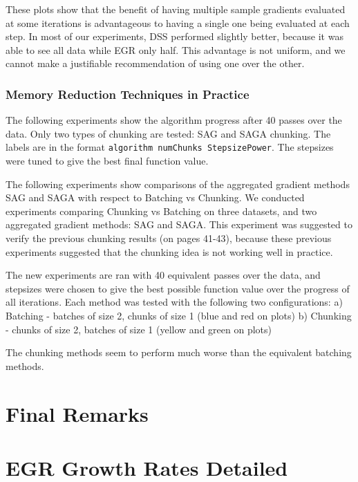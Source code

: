 \documentclass[11pt]{article}
\begin{document}
   These plots show that the benefit of having multiple sample gradients evaluated at some iterations is advantageous to having a single one being evaluated at each step. In most of our experiments, DSS performed slightly better, because it was able to see all data while EGR only half. This advantage is not uniform, and we cannot make a justifiable recommendation of using one over the other.
   
   \subsubsection{Memory Reduction Techniques in Practice}
   
   The following experiments show the algorithm progress after 40 passes over the data. Only two types of chunking are tested: SAG and SAGA chunking. The labels are in the format \texttt{algorithm numChunks StepsizePower}. The stepsizes were tuned to give the best final function value. 
   
   The following experiments show comparisons of the aggregated gradient methods SAG and SAGA with respect to Batching vs Chunking. We conducted experiments comparing Chunking vs Batching on three datasets, and two aggregated gradient methods: SAG and SAGA. This experiment was suggested to verify the previous chunking results (on pages 41-43), because these previous experiments suggested that the chunking idea is not working well in practice. 

   The new experiments are ran with 40 equivalent passes over the data, and stepsizes were chosen to give the best possible function value over the progress of all iterations. Each method was tested with the following two configurations:
   a) Batching - batches of size 2, chunks of size 1  (blue and red on plots)
   b) Chunking - chunks of size 2, batches of size 1 (yellow and green on plots)

   The chunking methods seem to perform much worse than the equivalent batching methods.

\section{Final Remarks} \label{finalr}


 \small 




\appendix 

\section{EGR Growth Rates Detailed} \label{appendix:EGRGrowthRatesDetailed}
   
\end{document}
